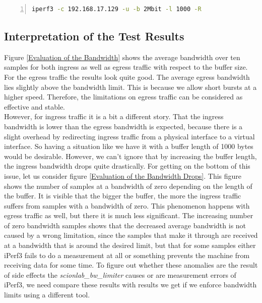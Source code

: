 \begin{lstlisting}[language=sh, caption = Example Ingress Test Command, captionpos=b, numbers=left, frame=single, breaklines=true, breakatwhitespace=true, showstringspaces=false, label=Example Ingress Test Command]
iperf3 -c 192.168.17.129 -u -b 2Mbit -l 1000 -R
\end{lstlisting}

\newpage

\subsection{Interpretation of the Test Results}

Figure \ref{Evaluation of the Bandwidth} shows the average bandwidth over ten samples for both ingress as well as egress traffic with respect to the buffer size. For the egress traffic the results look quite good. The average egress bandwidth lies slightly above the bandwidth limit. This is because we allow short bursts at a higher speed. Therefore, the limitations on egress traffic can be considered as effective and stable.
\\
However, for ingress traffic it is a bit a different story. That the ingress bandwidth is lower than the egress bandwidth is expected, because there is a slight overhead by redirecting ingress traffic from a physical interface to a virtual interface. So having a situation like we have it with a buffer length of 1000 bytes would be desirable. However, we can't ignore that by increasing the buffer length, the ingress bandwidth drops quite drastically. For getting on the bottom of this issue, let us consider figure \ref{Evaluation of the Bandwidth Drops}. This figure shows the number of samples at a bandwidth of zero depending on the length of the buffer. It is visible that the bigger the buffer, the more the ingress traffic suffers from samples with a bandwidth of zero. This phenomenon happens with egress traffic as well, but there it is much less significant. The increasing number of zero bandwidth samples shows that the decreased average bandwidth is not caused by a wrong limitation, since the samples that make it through are received at a bandwidth that is around the desired limit, but that for some samples either iPerf3 fails to do a measurement at all or something prevents the machine from receiving data for some time. To figure out whether these anomalies are the result of side effects the \textit{scionlab\_bw\_limiter} causes or are measurement errors of iPerf3, we need compare these results with results we get if we enforce bandwidth limits using a different tool.

